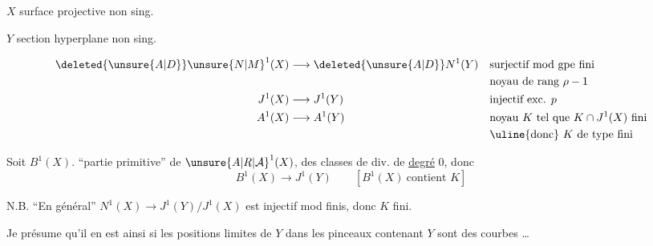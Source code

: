 $X$ surface projective non sing.

$Y$ section hyperplane non sing.

\[
\begin{aligned}
\deleted{\unsure{A|D}}\unsure{N|M}^{1}(X)&\longrightarrow\deleted{\unsure{A|D}}N^{1}(Y)
  &&\text{surjectif mod gpe fini}\\
&&&\text{noyau de rang $\rho-1$}\\
J^1(X)&\longrightarrow J^1(Y)&&\text{injectif exc. $p$}\\
A^1(X)&\longrightarrow A^1(Y)&&\text{noyau $K$ tel que $K\cap J^1(X)$ fini}\\
&&&\text{\uline{donc} $K$ de type fini}
\end{aligned}
\]

Soit $B^1(X)$. ``partie primitive'' de $\unsure{A|R|\mathcal{A}}^1(X)$,  des classes de div. de \uline{degré} $0$, donc
\[
 B^1(X)\longrightarrow J^1(Y)\qquad [B^1(X)\ \text{contient }K]
\]



N.B. ``En général'' $N^1(X)\longrightarrow J^1(Y)/J^1(X)$ est injectif mod  finis, donc $K$ fini.

Je présume qu'il en est ainsi si les positions limites de $Y$ dans les pinceaux  contenant $Y$ sont des courbes  \ldots
